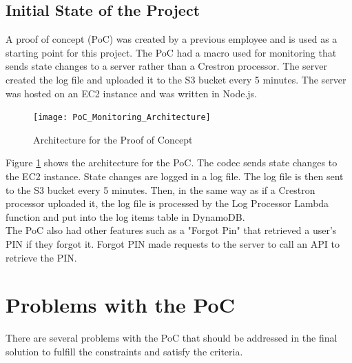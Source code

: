 \documentclass[letterpaper,12pt]{article}
\begin{document}

\subsection{Initial State of the Project}
A proof of concept (PoC) was created by a previous employee and is used as a starting point for this project. The PoC had a macro used for monitoring that sends state changes to a server rather than a Crestron processor. The server created the log file and uploaded it to the S3 bucket every 5 minutes. The server was hosted on an EC2 instance and was written in Node.js.

\begin{figure}[H]
\centering \texttt{[image: PoC\_Monitoring\_Architecture]}
\caption{\label{fig:PoCArchitecture}Architecture for the Proof of Concept}
\end{figure}

Figure \ref{fig:PoCArchitecture} shows the architecture for the PoC. The codec sends state changes to the EC2 instance. State changes are logged in a log file. The log file is then sent to the S3 bucket every 5 minutes. Then, in the same way as if a Crestron processor uploaded it, the log file is processed by the Log Processor Lambda function and put into the log items table in DynamoDB.\\

The PoC also had other features such as a "Forgot Pin" that retrieved a user's PIN if they forgot it. Forgot PIN made requests to the server to call an API to retrieve the PIN.


\section{Problems with the PoC} \label{sec:Problems with the PoC}
There are several problems with the PoC that should be addressed in the final solution to fulfill the constraints and satisfy the criteria.
\end{document}
